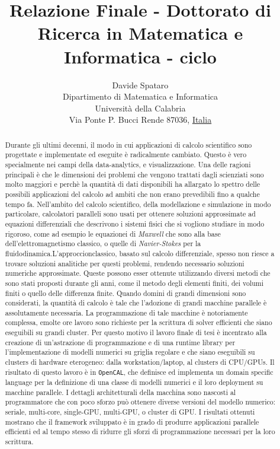 \documentclass[a4paper,11pt]{paper}
\newcommand{\RNum}[1]{\uppercase\expandafter{\romannumeral #1\relax}}
\begin{document}
	\title{Relazione Finale - Dottorato di Ricerca in Matematica e
		Informatica - \RNum{30} ciclo}
	\author{
		Davide Spataro \\
		Dipartimento di Matematica e Informatica\\
		Università della Calabria\\
		Via Ponte P. Bucci Rende 87036, \underline{Italia}
	}
	
	
	
	\maketitle
	 

	
	\begin{abstract}
		Durante gli ultimi decenni, il modo in cui applicazioni di calcolo scientifico sono progettate e implementate ed eseguite è radicalmente cambiato. Questo è vero specialmente nei campi della data-analytics, e visualizzazione. Una delle ragioni principali è che le dimensioni dei problemi che vengono trattati dagli scienziati sono molto maggiori e perchè la quantità di dati disponibili ha allargato lo spettro delle possibili applicazioni del calcolo ad ambiti che non erano prevedibili fino a qualche tempo fa.
		Nell'ambito del calcolo scientifico, della modellazione e simulazione in modo particolare, calcolatori paralleli sono usati per ottenere soluzioni approssimate ad equazioni differenziali che descrivono i sistemi fisici che si vogliono studiare in modo rigoroso, come ad esempio le equazionei di \textit{Maxwell} che sono alla base dell'elettromagnetismo classico, o quelle di \textit{Navier-Stokes} per la fluidodinamica.L'approccionclassico, basato sul calcolo differenziale, spesso non riesce a trovare soluzioni analitiche per questi problemi, rendendo necessario soluzioni numeriche approssimate.
		Queste possono esser ottenute utilizzando diversi metodi che sono stati proposti durante gli anni, come il metodo degli elementi finiti, dei volumi finiti o quello delle differenza finite. Quando domini di grandi dimensioni sono considerati, la quantità di calcolo è tale che l'adozione di grandi macchine parallele è assolutamente necessaria. La programmazione di tale macchine è notoriamente complessa, emolte ore lavoro  sono richieste per la scrittura di solver efficienti che siano eseguibili su grandi cluster. Per questo motivo il lavoro finale di tesi è incentrato alla creazione di un'astrazione di programmazione e di una runtime library per l'implementazione di modelli numerici su griglia regolare e che siano eseguibili su clusters di hardware eterogeneo: dalla workstation/laptop, al clusters di CPU/GPUs. Il risultato di questo lavoro è in \texttt{OpenCAL}, che definisce ed implementa un domain specific language per la definizione di una classe di modelli numerici e il loro deployment su macchine parallele. I dettagli architetturali della macchina sono nascosti al programmatore che  con poco sforzo può ottenere diverse versioni del modello numerico: seriale, multi-core, single-GPU, multi-GPU, o cluster di GPU. I risultati ottenuti mostrano che il framework sviluppato è in grado di produrre applicazioni parallele efficienti ed al tempo stesso di ridurre gli sforzi di programmazione necessari per la loro scrittura.



\end{abstract}
\end{document}
